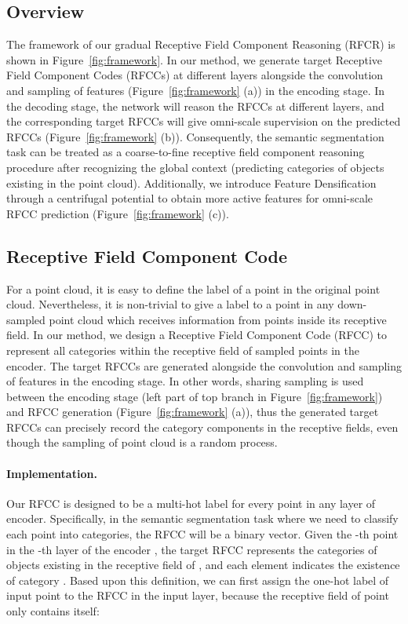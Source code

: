 \documentclass[final]{cvpr}
\begin{document}
\subsection{Overview}
\label{subsec:overview}

The framework of our gradual Receptive Field Component Reasoning (RFCR) is shown in Figure~\ref{fig:framework}. In our method, we generate target Receptive Field Component Codes (RFCCs) at different layers alongside the convolution and sampling of features (Figure~\ref{fig:framework} (a)) in the encoding stage. In the decoding stage, the network will reason the RFCCs at different layers, and the corresponding target RFCCs will give omni-scale supervision on the predicted RFCCs (Figure~\ref{fig:framework} (b)). Consequently, the semantic segmentation task can be treated as a coarse-to-fine receptive field component reasoning procedure after recognizing the global context (predicting categories of objects existing in the point cloud). Additionally, we introduce Feature Densification through a centrifugal potential to obtain more active features for omni-scale RFCC prediction (Figure~\ref{fig:framework} (c)).

\subsection{Receptive Field Component Code}
\label{subsec:rfcc}
For a point cloud, it is easy to define the label of a point in the original point cloud. Nevertheless, it is non-trivial to give a label to a point in any down-sampled point cloud which receives information from points inside its receptive field.
In our method, we design a Receptive Field Component Code (RFCC) to represent all categories within the receptive field of sampled points in the encoder. The target RFCCs are generated alongside the convolution and sampling of features in the encoding stage. In other words, sharing sampling is used between the encoding stage (left part of top branch in Figure~\ref{fig:framework}) and RFCC generation (Figure~\ref{fig:framework} (a)), thus the generated target RFCCs can precisely record the category components in the receptive fields, even though the sampling of point cloud is a random process.

\paragraph{Implementation.} Our RFCC is designed to be a multi-hot label for every point in any layer of encoder. Specifically, in the semantic segmentation task where we need to classify each point into  categories, the RFCC will be a  binary vector. Given the -th point in the -th layer of the encoder , the target RFCC  represents the categories of objects existing in the receptive field of , and each element  indicates the existence of category .
Based upon this definition, we can first assign the one-hot label of input point  to the RFCC  in the input layer, because the receptive field of point  only contains  itself:
\end{document}
